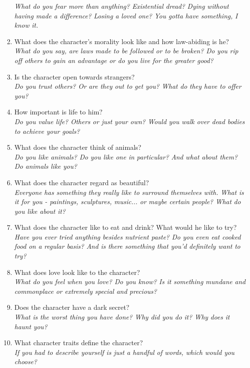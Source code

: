 \documentclass[12pt,a4paper,openany]{book}
\begin{document}
\begin{enumerate}
			\textit{What do you fear more than anything? Existential dread? Dying without having made a difference? Losing a loved one? You gotta have something, I know it.}
		\item What does the character’s morality look like and how law-abiding is he?\\
			\textit{What do you say, are laws made to be followed or to be broken? Do you rip off others to gain an advantage or do you live for the greater good?}
		\item Is the character open towards strangers?\\
			\textit{Do you trust others? Or are they out to get you? What do they have to offer you?}
		\item How important is life to him?\\
			\textit{Do you value life? Others or just your own? Would you walk over dead bodies to achieve your goals?}
		\item What does the character think of animals?\\
			\textit{Do you like animals? Do you like one in particular? And what about them? Do animals like you?}
		\item What does the character regard as beautiful?\\
			\textit{Everyone has something they really like to surround themselves with. What is it for you - paintings, sculptures, music... or maybe certain people? What do you like about it?}
		\item What does the character like to eat and drink? What would he like to try?\\
			\textit{Have you ever tried anything besides nutrient paste? Do you even eat cooked food on a regular basis? And is there something that you'd definitely want to try?}
		\item What does love look like to the character?\\
			\textit{What do you feel when you love? Do you know? Is it something mundane and commonplace or extremely special and precious?}
		\item Does the character have a dark secret?\\
			\textit{What is the worst thing you have done? Why did you do it? Why does it haunt you?}
		\item What character traits define the character?\\
			\textit{If you had to describe yourself is just a handful of words, which would you choose?}
	\end{enumerate}
\end{document}
